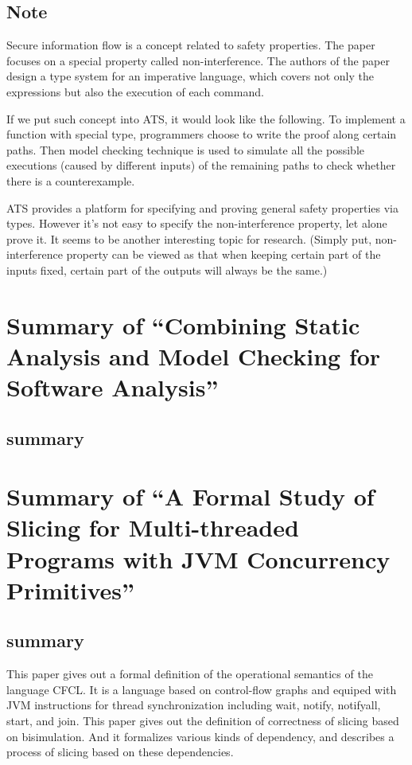 \documentclass{llncs}
\begin{document}
\subsection{Note}

Secure information flow is a concept related to safety properties. The paper focuses on
a special property called non-interference. The authors of the paper
design a type system for an imperative language, which covers not only the expressions but
also the execution of each command.

If we put such concept into ATS, it would look like the following. To implement a function
with special type, programmers choose to write the proof along certain paths. Then model
checking technique is used to simulate all the possible executions (caused by different
inputs) of the remaining paths to check whether there is a counterexample.

ATS provides a platform for specifying and proving general safety properties via types.
However it's not easy to specify the non-interference property, let alone prove it. 
It seems to be another interesting topic for research.
(Simply put, non-interference property can be viewed as that when keeping certain part
of the inputs fixed, certain part of the outputs will always be the same.)

\newpage

\section{Summary of ``Combining Static Analysis and Model Checking for 
Software Analysis''\cite{Brat2001Combining}} 
  \label{section:static_analysis_model_checking}

\subsection{summary}

\newpage

\section{Summary of ``A Formal Study of Slicing for Multi-threaded Programs with JVM
Concurrency Primitives''\cite{Hatcliff1999Formal}} 
  \label{section:slicing_jvm}
\subsection{summary}
This paper gives out a formal definition of the operational semantics of the language
CFCL. It is a language based on control-flow graphs and equiped with JVM instructions 
for thread synchronization including wait, notify, notifyall, start, and join. This
paper gives out the definition of correctness of slicing based on bisimulation. And it
formalizes various kinds of dependency, and describes a process of slicing based on
these dependencies.
\end{document}
